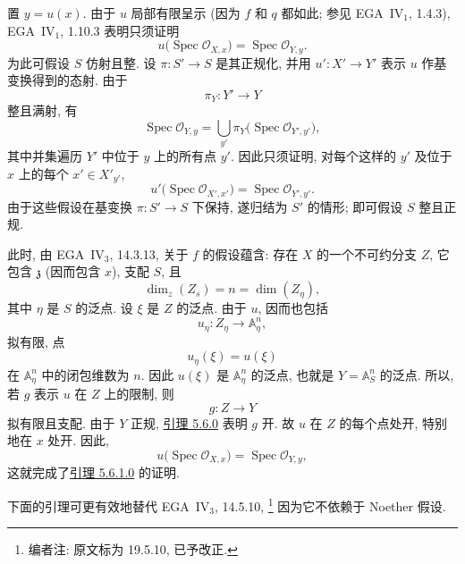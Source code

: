 置 \(y=u(x)\). 由于 \(u\) 局部有限呈示
(因为 \(f\) 和 \(q\) 都如此; 参见 EGA~IV\(_1\), 1.4.3),
EGA~IV\(_1\), 1.10.3 表明只须证明
\[
  u\bigl(\operatorname{Spec}\mathcal O_{X,x}\bigr)
  =\operatorname{Spec}\mathcal O_{Y,y}.
\]
为此可假设 \(S\) 仿射且整. 设 \(\pi:S'\to S\) 是其正规化,
并用 \(u':X'\to Y'\) 表示 \(u\) 作基变换得到的态射. 由于
\[
  \pi_Y:Y'\longrightarrow Y
\]
整且满射, 有
\[
  \operatorname{Spec}\mathcal O_{Y,y}
  =
  \bigcup_{y'}
  \pi_Y\bigl(\operatorname{Spec}\mathcal O_{Y',y'}\bigr),
\]
其中并集遍历 \(Y'\) 中位于 \(y\) 上的所有点 \(y'\).
因此只须证明, 对每个这样的 \(y'\) 及位于 \(x\) 上的每个
\(x'\in X'_{y'}\),
\[
  u'\bigl(\operatorname{Spec}\mathcal O_{X',x'}\bigr)
  =\operatorname{Spec}\mathcal O_{Y',y'}.
\]
由于这些假设在基变换 \(\pi:S'\to S\) 下保持,
遂归结为 \(S'\) 的情形; 即可假设 \(S\) 整且正规.

此时, 由 EGA~IV\(_3\), 14.3.13, 关于 \(f\) 的假设蕴含:
存在 \(X\) 的一个不可约分支 \(Z\), 它包含
\(\mathfrak z\) (因而包含 \(x\)), 支配 \(S\), 且
\[
  \dim_z(Z_s)=n=\dim(Z_\eta),
\]
其中 \(\eta\) 是 \(S\) 的泛点. 设 \(\xi\) 是 \(Z\) 的泛点.
由于 \(u\), 因而也包括
\[
  u_\eta:Z_\eta\longrightarrow\mathbb A^n_\eta,
\]
拟有限, 点
\[
  u_\eta(\xi)=u(\xi)
\]
在 \(\mathbb A^n_\eta\) 中的闭包维数为 \(n\).
因此 \(u(\xi)\) 是 \(\mathbb A^n_\eta\) 的泛点,
也就是 \(Y=\mathbb A^n_S\) 的泛点.
所以, 若 \(g\) 表示 \(u\) 在 \(Z\) 上的限制, 则
\[
  g:Z\longrightarrow Y
\]
拟有限且支配. 由于 \(Y\) 正规,
\hyperref[lem:sga3-VIB-5.6.0]{引理 5.6.0} 表明 \(g\) 开.
故 \(u\) 在 \(Z\) 的每个点处开, 特别地在 \(x\) 处开. 因此,
\[
  u\bigl(\operatorname{Spec}\mathcal O_{X,x}\bigr)
  =\operatorname{Spec}\mathcal O_{Y,y},
\]
这就完成了\hyperref[lem:sga3-VIB-5.6.1.0]{引理 5.6.1.0} 的证明.

下面的引理可更有效地替代 EGA~IV\(_3\), 14.5.10,%
\footnote{\label{note:sga3-VIB-40}编者注: 原文标为 19.5.10, 已予改正.}
因为它不依赖于 Noether 假设.

